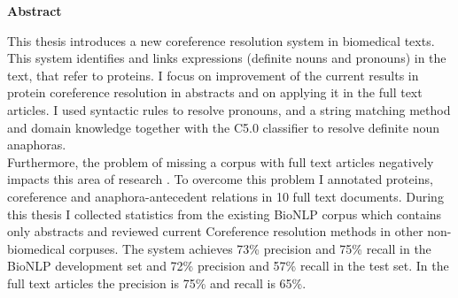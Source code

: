 

\clearemptydoublepage
{}
{}	





\vspace*{2cm}
\begin{center}
{\Large \bf Abstract}
\end{center}
\vspace{1cm}
This thesis introduces a new coreference resolution system in biomedical texts. This system identifies and links expressions (definite nouns and pronouns) in the text, that refer to proteins. I focus on  improvement of the  current results in protein coreference resolution in abstracts and  on applying it in the full text articles. I used syntactic rules to resolve pronouns, and  a string matching method  and domain knowledge together with the C5.0 classifier to resolve definite noun anaphoras. \\
  Furthermore, the problem of missing a corpus with full text articles negatively  impacts  this area of research . To overcome this problem I annotated  proteins, coreference and anaphora-antecedent relations in 10 full text documents. 
  During this thesis I collected statistics from the existing BioNLP corpus which contains only abstracts and reviewed current Coreference resolution methods in other non-biomedical corpuses.    
  The system achieves 73\% precision and 75\% recall in the BioNLP development set and 72\% precision and 57\% recall in the test set. In the full text articles the precision is 75\% and recall is 65\%.
 